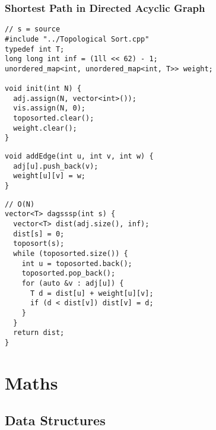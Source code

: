 \documentclass[twoside]{article}
\begin{document}
\begin{multicols*}{2}
\subsubsectionfont{\large\bfseries\sffamily\underline}
\subsubsection*{Shortest Path in Directed Acyclic Graph}
\begin{verbatim}
// s = source
#include "../Topological Sort.cpp"
typedef int T;
long long int inf = (1ll << 62) - 1;
unordered_map<int, unordered_map<int, T>> weight;

void init(int N) {
  adj.assign(N, vector<int>());
  vis.assign(N, 0);
  toposorted.clear();
  weight.clear();
}
\end{verbatim}
\vspace{-12pt}
\begin{verbatim}
void addEdge(int u, int v, int w) {
  adj[u].push_back(v);
  weight[u][v] = w;
}
\end{verbatim}
\vspace{-12pt}
\begin{verbatim}
// O(N)
vector<T> dagsssp(int s) {
  vector<T> dist(adj.size(), inf);
  dist[s] = 0;
  toposort(s);
  while (toposorted.size()) {
    int u = toposorted.back();
    toposorted.pop_back();
    for (auto &v : adj[u]) {
      T d = dist[u] + weight[u][v];
      if (d < dist[v]) dist[v] = d;
    }
  }
  return dist;
}
\end{verbatim}

\sectionfont{\bfseries\sffamily\centering\Huge}
\vspace{1em}
\section*{Maths}
\vspace{3em}
\subsectionfont{\bfseries\sffamily\centering\LARGE}
\vspace{0em}
\subsection*{Data Structures}
\vspace{2em}
\subsubsectionfont{\large\bfseries\sffamily\underline}

\end{multicols*}
\end{document}
